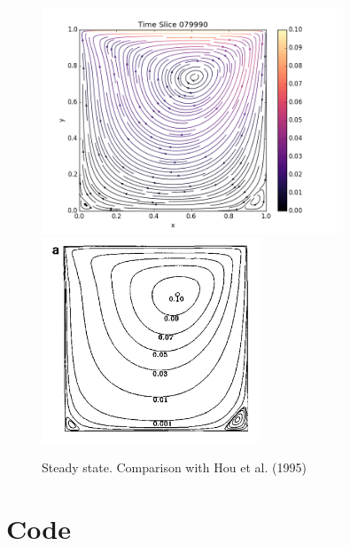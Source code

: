 \documentclass[11pt]{article}
\begin{document}
\begin{center}
\begin{figure}[ht!]
\begin{minipage}{16cm}\label{steady}
\includegraphics[width=9cm]{final}\includegraphics[width=6.5cm]{HouStreamlines}
\end{minipage}
\caption{Steady state. Comparison with Hou et al. (1995)}
\end{figure}
\end{center}

\appendix
\section{Code}


\end{document}
